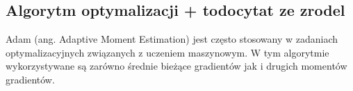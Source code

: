 \newpage
\subsection{Algorytm optymalizacji + todo{cytat ze zrodel}}
Adam (ang. Adaptive Moment Estimation) jest często stosowany w zadaniach optymalizacyjnych związanych z uczeniem maszynowym.
W tym algorytmie wykorzystywane są zarówno średnie bieżące gradientów jak i drugich momentów gradientów.
